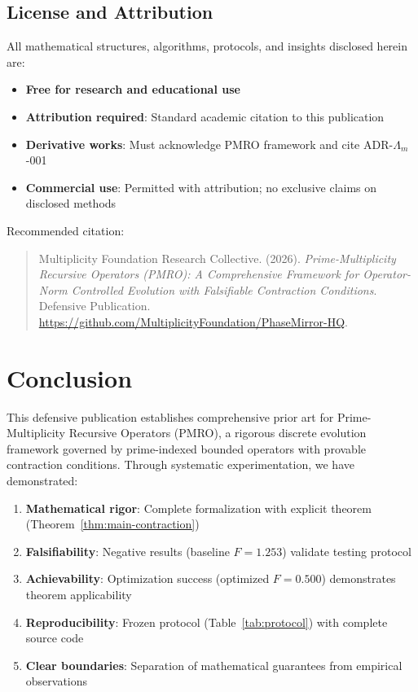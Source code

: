 \documentclass[11pt,a4paper]{article}
\begin{document}
\subsection{License and Attribution}

All mathematical structures, algorithms, protocols, and insights disclosed herein are:

\begin{itemize}
\item \textbf{Free for research and educational use}
\item \textbf{Attribution required}: Standard academic citation to this publication
\item \textbf{Derivative works}: Must acknowledge PMRO framework and cite ADR-\(\Lambda_m\)-001
\item \textbf{Commercial use}: Permitted with attribution; no exclusive claims on disclosed methods
\end{itemize}

Recommended citation:
\begin{quote}
Multiplicity Foundation Research Collective. (2026). \emph{Prime-Multiplicity Recursive Operators (PMRO): A Comprehensive Framework for Operator-Norm Controlled Evolution with Falsifiable Contraction Conditions}. Defensive Publication. \url{https://github.com/MultiplicityFoundation/PhaseMirror-HQ}.
\end{quote}

\section{Conclusion}

This defensive publication establishes comprehensive prior art for Prime-Multiplicity Recursive Operators (PMRO), a rigorous discrete evolution framework governed by prime-indexed bounded operators with provable contraction conditions. Through systematic experimentation, we have demonstrated:

\begin{enumerate}
\item \textbf{Mathematical rigor}: Complete formalization with explicit theorem (Theorem~\ref{thm:main-contraction})
\item \textbf{Falsifiability}: Negative results (baseline \(F=1.253\)) validate testing protocol
\item \textbf{Achievability}: Optimization success (optimized \(F=0.500\)) demonstrates theorem applicability
\item \textbf{Reproducibility}: Frozen protocol (Table~\ref{tab:protocol}) with complete source code
\item \textbf{Clear boundaries}: Separation of mathematical guarantees from empirical observations
\end{enumerate}
\end{document}
